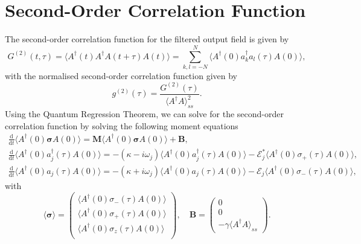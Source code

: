\documentclass{article}
\newcommand{\ddt}[1][]{\frac{\mathrm{d} #1}{\mathrm{d}t}}
\begin{document}
\section{Second-Order Correlation Function}
The second-order correlation function for the filtered output field is given by
\begin{equation}
	G^{(2)}(t, \tau) = \langle A^{\dagger}(t) A^{\dagger} A(t + \tau) A(t) \rangle = \sum_{k,l=-N}^{N} \langle A^{\dagger}(0) a^{\dagger}_{k} a_{l} (\tau) A(0) \rangle,
\end{equation}
with the normalised second-order correlation function given by
\begin{equation}
	g^{(2)}(\tau) = \frac{G^{(2)}(\tau)}{\langle A^{\dagger} A \rangle_{ss}^{2}}.
\end{equation}
Using the Quantum Regression Theorem, we can solve for the second-order correlation function by solving the following moment equations
\begin{subequations}
	\begin{gather}
		\ddt \langle A^{\dagger}(0) \bm{\sigma} A(0) \rangle = \bm{M} \langle A^{\dagger}(0) \bm{\sigma} A(0) \rangle + \bm{B}, \\
		\ddt \langle A^{\dagger}(0) a^{\dagger}_{j}(\tau) A(0) \rangle = -\left( \kappa - i \omega_{j} \right) \langle A^{\dagger}(0) a^{\dagger}_{j}(\tau) A(0) \rangle - \mathcal{E}_{j}^{*} \langle A^{\dagger}(0) \sigma_{+}(\tau) A(0) \rangle, \\
		\ddt \langle A^{\dagger}(0) a_{j}(\tau) A(0) \rangle = -\left( \kappa + i \omega_{j} \right) \langle A^{\dagger}(0) a_{j}(\tau) A(0) \rangle - \mathcal{E}_{j} \langle A^{\dagger}(0) \sigma_{-}(\tau) A(0) \rangle,
	\end{gather}
\end{subequations}
with
\begin{equation}
	\langle \bm{\sigma} \rangle = 
	\begin{pmatrix}
		\langle A^{\dagger}(0) \sigma_{-}(\tau) A(0) \rangle \\
		\langle A^{\dagger}(0) \sigma_{+}(\tau) A(0) \rangle \\
		\langle A^{\dagger}(0) \sigma_{z}(\tau) A(0) \rangle \\
	\end{pmatrix}, \quad \bm{B} = 
	\begin{pmatrix}
		0 \\
		0 \\
		-\gamma \langle A^{\dagger} A \rangle_{ss}
	\end{pmatrix}.
\end{equation}
\end{document}
